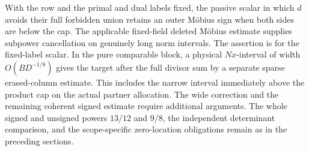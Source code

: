 With the row and the primal and dual labels fixed, the passive scalar
in which \(d\) avoids their full forbidden union retains an outer
M\"obius sign when both sides are below the cap. The applicable
fixed-field deleted M\"obius estimate supplies subpower cancellation on
genuinely long norm intervals. The assertion is for the fixed-label
scalar. In the pure comparable block, a physical \(Nx\)-interval of
width \(O(BD^{-1/8})\) gives the target after the full divisor sum by a
separate sparse erased-column estimate. This includes the narrow
interval immediately above the product cap on the actual partner
allocation. The wide correction and the remaining coherent signed
estimate require additional arguments. The whole signed and unsigned
powers \(13/12\) and \(9/8\), the independent determinant comparison,
and the scope-specific zero-location obligations remain as in the
preceding sections.
